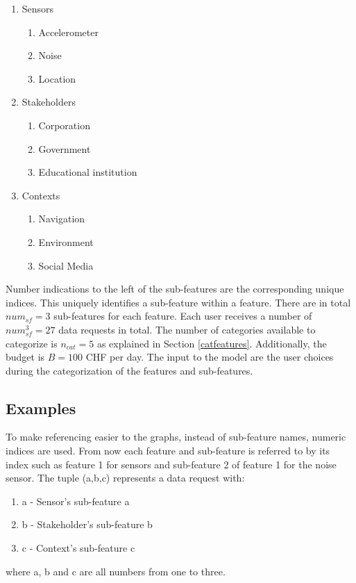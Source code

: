 \begin{enumerate}
    \item Sensors
    \begin{enumerate}
    \item Accelerometer 
    \item Noise 
    \item Location 
   \end{enumerate}
    \item Stakeholders 
    \begin{enumerate}
    \item Corporation 
    \item Government 
    \item Educational institution 
   \end{enumerate}
   \item Contexts
    \begin{enumerate}
    \item Navigation 
    \item Environment 
    \item Social Media 
   \end{enumerate}
 \end{enumerate}
 
Number indications to the left of the sub-features are the corresponding unique indices. This uniquely identifies a sub-feature within a feature. There are in total $num_{sf}=3$ sub-features for each feature.
Each user receives a number of $num_{sf}^3=27$ data requests in total. The number of categories available to categorize is $n_{cat}=5$ as explained in Section \ref{catfeatures}. Additionally, the budget is $B=100$ CHF per day. 
The input to the model are the user choices during the categorization of the features and sub-features.

\subsection{Examples}

To make referencing easier to the graphs, instead of sub-feature names, numeric indices are used. From now each feature and sub-feature is referred to by its index such as feature 1 for sensors and sub-feature 2 of feature 1 for the noise sensor. The tuple (a,b,c) represents a data request with:
\begin{enumerate}
    \item a - Sensor's sub-feature a
    \item b - Stakeholder's sub-feature b
    \item c - Context's sub-feature c
   \end{enumerate}
where a, b and c are all numbers from one to three. 


